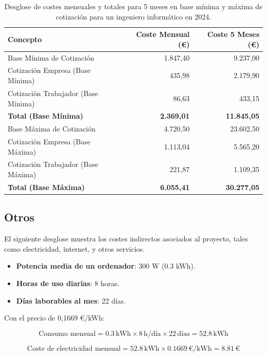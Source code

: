 \begin{table}[h!]
    \centering
    \begin{tabular}{lrr}
        \toprule
        \textbf{Concepto} & \textbf{Coste Mensual (€)} & \textbf{Coste 5 Meses (€)} \\
        \midrule
        Base Mínima de Cotización & 1.847,40 & 9.237,00 \\
        Cotización Empresa (Base Mínima) & 435,98 & 2.179,90 \\
        Cotización Trabajador (Base Mínima) & 86,63 & 433,15 \\
        \textbf{Total (Base Mínima)} & \textbf{2.369,01} & \textbf{11.845,05} \\
        \midrule
        Base Máxima de Cotización & 4.720,50 & 23.602,50 \\
        Cotización Empresa (Base Máxima) & 1.113,04 & 5.565,20 \\
        Cotización Trabajador (Base Máxima) & 221,87 & 1.109,35 \\
        \textbf{Total (Base Máxima)} & \textbf{6.055,41} & \textbf{30.277,05} \\
        \bottomrule
    \end{tabular}
    \caption{Desglose de costes mensuales y totales para 5 meses en base mínima y máxima de cotización para un ingeniero informático en 2024.}
    \end{table}
        
    
\subsection{Otros}
    El siguiente desglose muestra los costes indirectos asociados al proyecto, tales como electricidad, internet, y otros servicios.

    \begin{itemize}
        \item \textbf{Potencia media de un ordenador}: 300 W (0.3 kWh).
        \item \textbf{Horas de uso diarias}: 8 horas.
        \item \textbf{Días laborables al mes}: 22 días.
    \end{itemize}
    
    Con el precio de 0,1669 €/kWh:
    
    \[
    \text{Consumo mensual} = 0.3 \, \text{kWh} \times 8 \, \text{h/día} \times 22 \, \text{días} = 52.8 \, \text{kWh}
    \]
    
    \[
    \text{Coste de electricidad mensual} = 52.8 \, \text{kWh} \times 0.1669 \, \text{€/kWh} = 8.81 \, \text{€}
    \]
    

